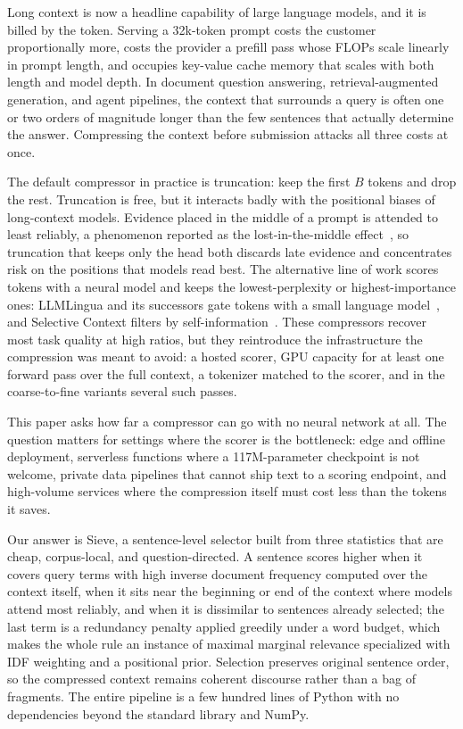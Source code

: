 \documentclass{article}
\newcommand{\method}{Sieve}
\begin{document}
Long context is now a headline capability of large language models, and
it is billed by the token. Serving a 32k-token prompt costs the customer
proportionally more, costs the provider a prefill pass whose FLOPs scale
linearly in prompt length, and occupies key-value cache memory that
scales with both length and model depth. In document question answering,
retrieval-augmented generation, and agent pipelines, the context that
surrounds a query is often one or two orders of magnitude longer than the
few sentences that actually determine the answer. Compressing the context
before submission attacks all three costs at once.

The default compressor in practice is truncation: keep the first $B$
tokens and drop the rest. Truncation is free, but it interacts badly with
the positional biases of long-context models. Evidence placed in the
middle of a prompt is attended to least reliably, a phenomenon reported
as the lost-in-the-middle effect~\citep{liu2023lost}, so truncation that
keeps only the head both discards late evidence and concentrates risk on
the positions that models read best. The alternative line of work scores
tokens with a neural model and keeps the lowest-perplexity or
highest-importance ones: LLMLingua and its successors gate tokens with a
small language model~\citep{jiang2023llmlingua,
jiang2023longllmlingua,pan2024llmlingua2}, and Selective Context filters
by self-information~\citep{li2023selective}. These compressors recover
most task quality at high ratios, but they reintroduce the infrastructure
the compression was meant to avoid: a hosted scorer, GPU capacity for at
least one forward pass over the full context, a tokenizer matched to the
scorer, and in the coarse-to-fine variants several such passes.

This paper asks how far a compressor can go with no neural network at
all. The question matters for settings where the scorer is the
bottleneck: edge and offline deployment, serverless functions where a
117M-parameter checkpoint is not welcome, private data pipelines that
cannot ship text to a scoring endpoint, and high-volume services where
the compression itself must cost less than the tokens it saves.

Our answer is \method{}, a sentence-level selector built from three
statistics that are cheap, corpus-local, and question-directed. A
sentence scores higher when it covers query terms with high
inverse document frequency computed over the context itself, when it sits
near the beginning or end of the context where models attend most
reliably, and when it is dissimilar to sentences already selected; the
last term is a redundancy penalty applied greedily under a word budget,
which makes the whole rule an instance of maximal marginal relevance
\citep{carbonell1998mmr} specialized with IDF weighting
\citep{robertson2009bm25} and a positional prior. Selection preserves
original sentence order, so the compressed context remains coherent
discourse rather than a bag of fragments. The entire pipeline is a few
hundred lines of Python with no dependencies beyond the standard library
and NumPy.
\end{document}
